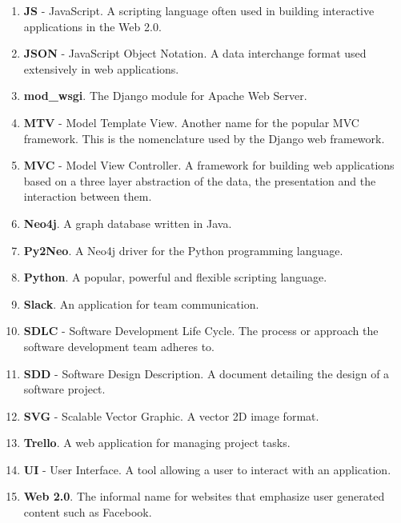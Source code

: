 \documentclass[12pt,onecolumn]{article}
\begin{document}
\begin{enumerate}
		\item \textbf{JS} - JavaScript. A scripting language often used in building interactive applications in the Web 2.0.
		
		\item \textbf{JSON} - JavaScript Object Notation. A data interchange format used extensively in web applications.
		
		\item \textbf{mod\_wsgi}. The Django module for Apache Web Server.
		
		\item \textbf{MTV} - Model Template View. Another name for the popular MVC framework. This is the nomenclature used by the Django web framework.
		
		\item \textbf{MVC} - Model View Controller. A framework for building web applications based on a three layer abstraction of the data, the presentation and the interaction between them. 
		
		\item \textbf{Neo4j}. A graph database written in Java.
		
		\item \textbf{Py2Neo}. A Neo4j driver for the Python programming language.
		
		\item \textbf{Python}. A popular, powerful and flexible scripting language.
		
		\item \textbf{Slack}. An application for team communication.
		
		\item \textbf{SDLC} - Software Development Life Cycle. The process or approach the software development team adheres to.
		
		\item \textbf{SDD} - Software Design Description. A document detailing the design of a software project.
		
		\item \textbf{SVG} - Scalable Vector Graphic. A vector 2D image format.
		
		\item \textbf{Trello}. A web application for managing project tasks.
		
		\item \textbf{UI} - User Interface. A tool allowing a user to interact with an application.
		
		\item \textbf{Web 2.0}. The informal name for websites that emphasize user generated content such as Facebook.
		
		
	\end{enumerate}
	
\end{document}
